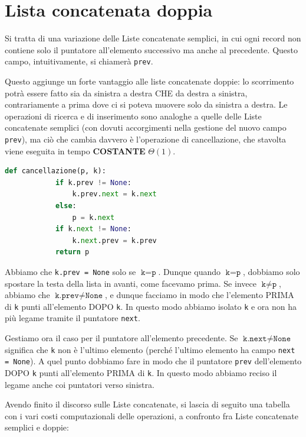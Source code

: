 \documentclass[12pt]{report}
\begin{document}
    \section{Lista concatenata doppia}
    Si tratta di una variazione delle Liste concatenate semplici, in cui ogni record non contiene solo il puntatore all'elemento successivo ma anche al precedente. Questo campo, intuitivamente, si chiamerà \texttt{prev}.
    
    Questo aggiunge un forte vantaggio alle liste concatenate doppie: lo scorrimento potrà essere fatto sia da sinistra a destra CHE da destra a sinistra, contrariamente a prima dove ci si poteva muovere solo da sinistra a destra.
    Le operazioni di ricerca e di inserimento sono analoghe a quelle delle Liste concatenate semplici (con dovuti accorgimenti nella gestione del nuovo campo \texttt{prev}), ma ciò che cambia davvero è l'operazione di cancellazione, che stavolta viene eseguita in tempo \textbf{COSTANTE} $\Theta(1)$.
    
    \begin{lstlisting}[language=Python, caption={Cancellazione in una lista concatenata doppia}]
    	def cancellazione(p, k):
    		if k.prev != None:
    			k.prev.next = k.next
    		else:
    			p = k.next
    		if k.next != None:
    			k.next.prev = k.prev
    		return p
    \end{lstlisting}
    
    Abbiamo che \texttt{k.prev = None} solo se $\texttt{k} = \texttt{p}$. Dunque quando $\texttt{k} = \texttt{p}$, dobbiamo solo spostare la testa della lista in avanti, come facevamo prima. Se invece $\texttt{k} \neq \texttt{p}$, abbiamo che $\texttt{k.prev} \neq \texttt{None}$, e dunque facciamo in modo che l'elemento PRIMA di \texttt{k} punti all'elemento DOPO \texttt{k}. In questo modo abbiamo isolato \texttt{k} e ora non ha più legame tramite il puntatore \texttt{next}.
    
    Gestiamo ora il caso per il puntatore all'elemento precedente. Se $\texttt{k.next} \neq \texttt{None}$ significa che \texttt{k} non è l'ultimo elemento (perché l'ultimo elemento ha campo \texttt{next = None}). A quel punto dobbiamo fare in modo che il puntatore \texttt{prev} dell'elemento DOPO \texttt{k} punti all'elemento PRIMA di \texttt{k}. In questo modo abbiamo reciso il legame anche coi puntatori verso sinistra.
    
    Avendo finito il discorso sulle Liste concatenate, si lascia di seguito una tabella con i vari costi computazionali delle operazioni, a confronto fra Liste concatenate semplici e doppie:
    
\end{document}
